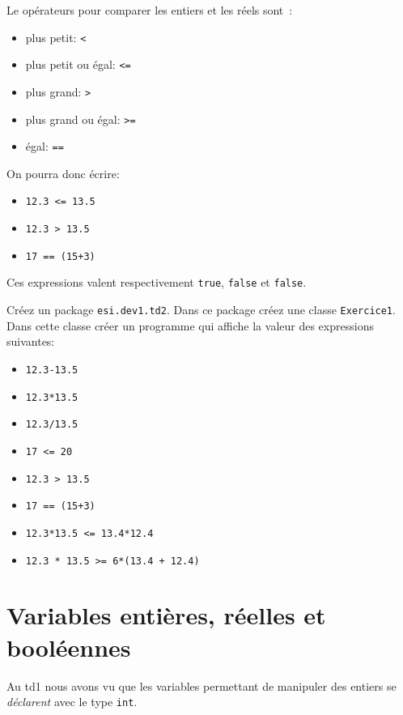 \documentclass[a4paper,11pt]{article}
\begin{document}
	Le opérateurs pour comparer les entiers et les réels sont~:

	\begin{itemize}
		\item plus petit: \texttt{<}
		\item plus petit ou égal: \texttt{<=}
		\item plus grand: \texttt{>}
		\item plus grand ou égal: \texttt{>=}
		\item  égal: \texttt{==}
	\end{itemize} 

	On pourra donc écrire: 
	\begin{itemize}
		\item \texttt{12.3 <= 13.5}
		\item \texttt{12.3 > 13.5}
		\item \texttt{17 == (15+3)}
	\end{itemize}
	Ces expressions valent respectivement \texttt{true}, \texttt{false} et \texttt{false}.

	\hspeparator

\Exercice{}
	Créez un package \texttt{esi.dev1.td2}.
	Dans ce package créez une classe \texttt{Exercice1}.
	Dans cette classe créer un programme qui affiche la valeur des expressions suivantes:
	
	\begin{itemize}		
		\item \texttt{12.3-13.5}
		\item \texttt{12.3*13.5}
		\item \texttt{12.3/13.5}
		
		\item \texttt{17 <= 20}
		\item \texttt{12.3 > 13.5}
		\item \texttt{17 == (15+3)}
		\item \texttt{12.3*13.5 <= 13.4*12.4}
		\item \texttt{12.3 * 13.5 >= 6*(13.4 + 12.4)}
	\end{itemize}



\section{Variables entières, réelles et booléennes}


	Au td1 nous avons vu que les variables permettant de manipuler des entiers 
	se \emph{déclarent} avec le type \texttt{int}. 
	
\end{document}
